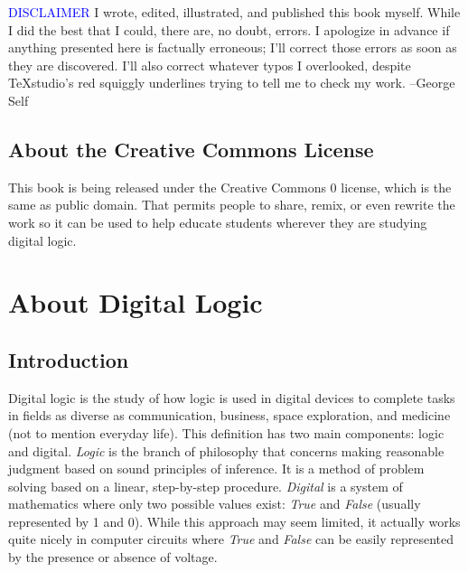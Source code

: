 \medskip

\begin{tcolorbox}[colback=blue!5!white,colframe=blue!75!black]
  \textcolor{blue}{DISCLAIMER}
  \tcblower
  \textsf{I wrote, edited, illustrated, and published this book myself. While I did the best that I could, there are, no doubt, errors. I apologize in advance if anything presented here is factually erroneous; I'll correct those errors as soon as they are discovered. I'll also correct whatever typos I overlooked, despite TeXstudio's red squiggly underlines trying to tell me to check my work. --George Self}
\end{tcolorbox}

\medskip

\subsection{About the Creative Commons License}

This book is being released under the Creative Commons 0 license, which is the same as public domain. That permits people to share, remix, or even rewrite the work so it can be used to help educate students wherever they are studying digital logic. 


\section{About Digital Logic}

\subsection{Introduction}

Digital logic is the study of how logic is used in digital devices to complete tasks in fields as diverse as communication, business, space exploration, and medicine (not to mention everyday life). This definition has two main components: logic and digital. \emph{Logic} is the branch of philosophy that concerns making reasonable judgment based on sound principles of inference. It is a method of problem solving based on a linear, step-by-step procedure. \emph{Digital} is a system of mathematics where only two possible values exist: \emph{True} and \emph{False} (usually represented by 1 and 0). While this approach may seem limited, it actually works quite nicely in computer circuits where \emph{True} and \emph{False} can be easily represented by the presence or absence of voltage.

